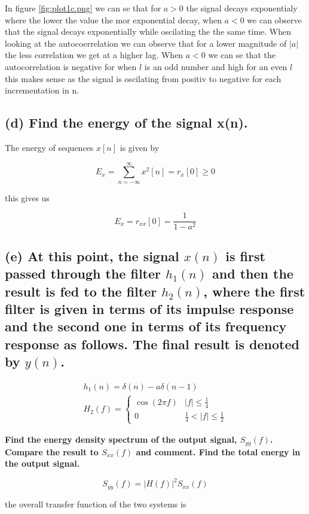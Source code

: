 
In figure \ref{fig:plot1c.png} we can se that for $a>0$ the signal decays exponentialy where the lower the value the mor exponential decay, when $a<0$ we can observe that the signal decays exponentially while oscilating the the same time. When looking at the autocoerrelation we can observe that for a lower magnitude of $|a|$ the less correlation we get at a higher lag. When $a<0$ we can se that the autocorrelation is negative for when $l$ is an odd number and high for an even $l$ this makes sense as the signal is oscilating from positiv to negative for each incrementation in n.

\subsection*{(d) Find the energy of the signal x(n).}

The energy of sequences $x[n]$ is given by

$$
E_x=\sum_{n=-\infty}^{\infty} x^2[n]=r_x[0] \geq 0
$$

this gives us

$$
E_x=r_{xx}[0]=\frac{1}{1-a^{2}}
$$


\subsection*{(e) At this point, the signal $x(n)$ is first passed through the filter $h_1(n)$ and then the result is fed to the filter $h_2(n)$, where the first filter is given in terms of its impulse response and the second one in terms of its frequency response as follows. The final result is denoted by $y(n)$.}
$$
\begin{gathered}
h_1(n)=\delta(n)-a \delta(n-1) \\
H_2(f)= \begin{cases}\cos (2 \pi f) & |f| \leq \frac{1}{4} \\
0 & \frac{1}{4}<|f| \leq \frac{1}{2}\end{cases}
\end{gathered}
$$

\textbf{Find the energy density spectrum of the output signal, $S_{y y}(f)$. Compare the result to $S_{x x}(f)$ and comment. Find the total energy in the output signal.}

$$S_{yy}(f)=|H(f)|^2S_{xx}(f)$$

the overall transfer function of the two systems is





